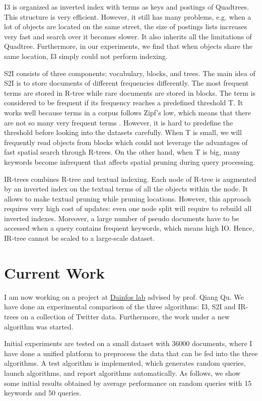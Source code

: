 \documentclass[11pt,a4paper]{article}
\begin{document}
 	I3 is organized as inverted index with terms as keys and postings of Quadtrees. This structure is very efficient. However, it still has many problems, e.g. when a lot of objects are located on the same street, the size of postings lists increases very fast and search over it becomes slower. It also inherits all the limitations of Quadtree. Furthermore, in our experiments, we find that when objects share the same location, I3 simply could not perform indexing. 
 	
 	S2I consists of three components: vocabulary, blocks, and trees. The main idea of S2I is to store documents of different frequencies differently. The most frequent terms are stored in R-tree while rare documents are stored in blocks. The term is considered to be frequent if its frequency reaches a predefined threshold T. It works well because terms in a corpus follows Zipf's low, which means that there are not so many very frequent terms \cite{rocha2011efficient}. However, it is hard to predefine the threshold before looking into the datasets carefully. When T is small, we will frequently read objects from blocks which could not leverage the advantages of fast spatial search through R-trees. On the other hand, when T is big, many keywords become infrequent that affects spatial pruning during query processing. 
 	
 	IR-trees combines R-tree and textual indexing. Each node of R-tree is augmented by an inverted index on the textual terms of all the objects within the node. It allows to make textual pruning while pruning locations. However, this approach requires very high cost of updates: even one node split will require to rebuild all inverted indexes. Moreover, a large number of pseudo documents have to be accessed when a query contains frequent keywords, which means high IO. Hence, IR-tree cannot be scaled to a large-scale dataset. 
 	
 	\section{Current Work}
 	I am now working on a project at \href{http://dainfos.com}{Dainfos lab} advised by prof. Qiang Qu. We have done an experimental comparison of the three algorithms: I3, S2I and IR-trees on a collection of Twitter data. Furthermore, the work under a new algorithm was started.
 	
 	Initial experiments are tested on a small dataset with 36000 documents, where I have done a unified platform to preprocess the data that can be fed into the three algorithms. A test algorithm is implemented, which generates random queries, launch algorithms, and report algorithms automatically. As follows, we show some initial results obtained by average performance on random queries with 15 keywords and 50 queries. 
 	
\end{document}
